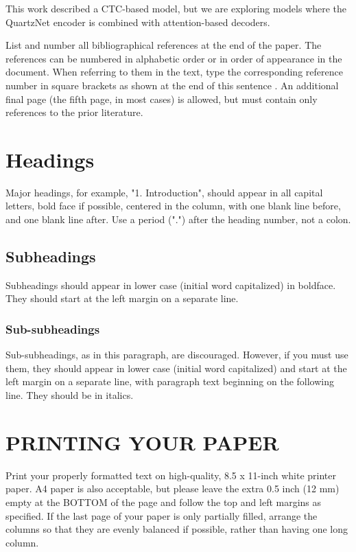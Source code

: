 \documentclass{article}
\begin{document}
This work described a CTC-based model, but we are exploring models where the QuartzNet encoder is combined with attention-based decoders.






\iffalse
List and number all bibliographical references at the end of the
paper. The references can be numbered in alphabetic order or in
order of appearance in the document. When referring to them in
the text, type the corresponding reference number in square
brackets as shown at the end of this sentence \cite{C2}. An
additional final page (the fifth page, in most cases) is
allowed, but must contain only references to the prior
literature.

\section{Headings}
\label{sec:majhead}

Major headings, for example, "1. Introduction", should appear in all capital
letters, bold face if possible, centered in the column, with one blank line
before, and one blank line after. Use a period (".") after the heading number,
not a colon.

\subsection{Subheadings}
\label{ssec:subhead}

Subheadings should appear in lower case (initial word capitalized) in
boldface. They should start at the left margin on a separate line.
 
\subsubsection{Sub-subheadings}
\label{sssec:subsubhead}

Sub-subheadings, as in this paragraph, are discouraged. However, if you
must use them, they should appear in lower case (initial word
capitalized) and start at the left margin on a separate line, with paragraph
text beginning on the following line. They should be in italics.

\section{PRINTING YOUR PAPER}
\label{sec:print}

Print your properly formatted text on high-quality, 8.5 x 11-inch white printer
paper. A4 paper is also acceptable, but please leave the extra 0.5 inch (12 mm)
empty at the BOTTOM of the page and follow the top and left margins as
specified. If the last page of your paper is only partially filled, arrange
the columns so that they are evenly balanced if possible, rather than having
one long column.
\end{document}
